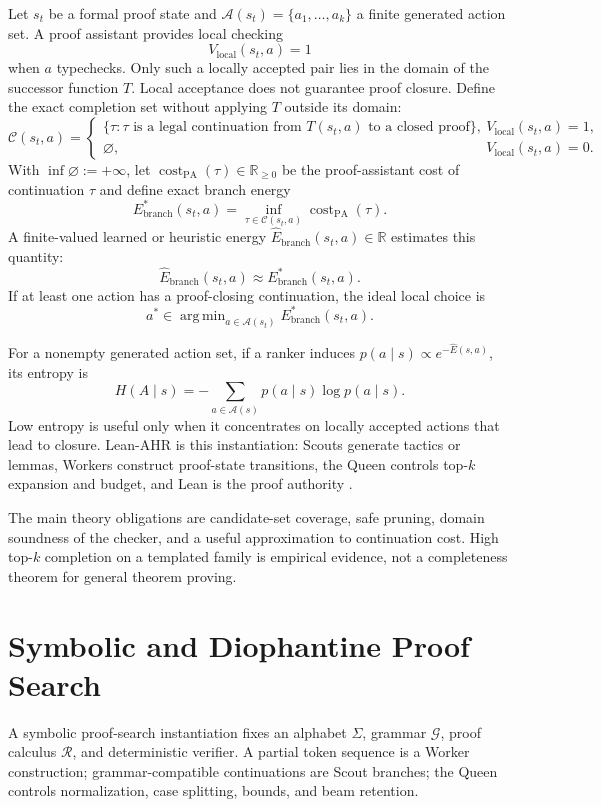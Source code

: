 \documentclass[11pt,oneside]{book}
\theoremstyle{remark}
\DeclareMathOperator*{\argmin}{arg\,min}
\DeclareMathOperator{\cost}{cost}
\begin{document}
Let $s_t$ be a formal proof state and $\mathcal A(s_t)=\{a_1,\ldots,a_k\}$ a finite generated action set. A proof assistant provides local checking
\[
V_{\mathrm{local}}(s_t,a)=1
\]
when $a$ typechecks. Only such a locally accepted pair lies in the domain of
the successor function $T$. Local acceptance does not guarantee proof
closure. Define the exact completion set without applying $T$ outside its
domain:
\[
\mathcal C(s_t,a)=
\begin{cases}
\{\tau:\tau\text{ is a legal continuation from }T(s_t,a)
\text{ to a closed proof}\},
&V_{\mathrm{local}}(s_t,a)=1,\\
\varnothing,&V_{\mathrm{local}}(s_t,a)=0.
\end{cases}
\]
With $\inf\varnothing:=+\infty$, let
$\cost_{\mathrm{PA}}(\tau)\in\mathbb R_{\ge0}$ be the proof-assistant cost of
continuation $\tau$ and define exact branch energy
\[
E_{\mathrm{branch}}^*(s_t,a)
=\inf_{\tau\in\mathcal C(s_t,a)}\cost_{\mathrm{PA}}(\tau).
\]
A finite-valued learned or heuristic energy
$\widehat E_{\mathrm{branch}}(s_t,a)\in\mathbb R$ estimates this quantity:
\[
\widehat E_{\mathrm{branch}}(s_t,a)
\approx E_{\mathrm{branch}}^*(s_t,a).
\]
If at least one action has a proof-closing continuation, the ideal local
choice is
\[
a^*\in\argmin_{a\in\mathcal A(s_t)}
E_{\mathrm{branch}}^*(s_t,a).
\]

For a nonempty generated action set, if a ranker induces
$p(a\mid s)\propto e^{-\widehat E(s,a)}$, its entropy is
\[
H(A\mid s)=-\sum_{a\in\mathcal A(s)}p(a\mid s)\log p(a\mid s).
\]
Low entropy is useful only when it concentrates on locally accepted actions that lead to closure. Lean-AHR is this instantiation: Scouts generate tactics or lemmas, Workers construct proof-state transitions, the Queen controls top-$k$ expansion and budget, and Lean is the proof authority \cite{FalkenburgLeanAHR2026}.

The main theory obligations are candidate-set coverage, safe pruning, domain soundness of the checker, and a useful approximation to continuation cost. High top-$k$ completion on a templated family is empirical evidence, not a completeness theorem for general theorem proving.

\chapter{Symbolic and Diophantine Proof Search}

A symbolic proof-search instantiation fixes an alphabet $\Sigma$, grammar $\mathcal G$, proof calculus $\mathcal R$, and deterministic verifier. A partial token sequence is a Worker construction; grammar-compatible continuations are Scout branches; the Queen controls normalization, case splitting, bounds, and beam retention.
\end{document}
